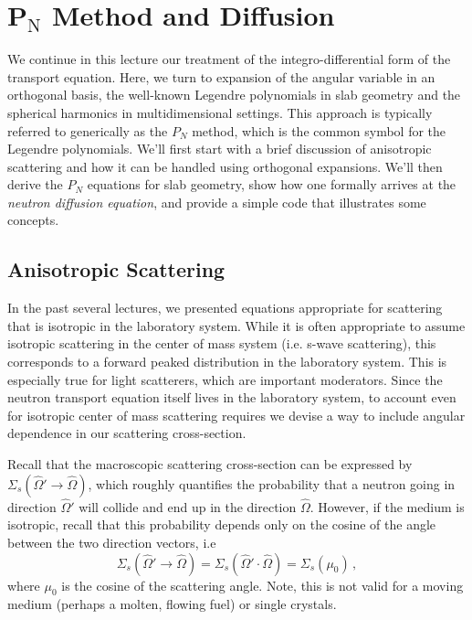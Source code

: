 \chapter{P$\mathrm{_N}$ Method and Diffusion}
\label{lec:pn_method_and_diffusion}

We continue in this lecture our treatment of the integro-differential form of the transport equation.  Here, we turn to expansion of the angular variable in an orthogonal basis, the well-known Legendre polynomials in slab geometry and the spherical harmonics in multidimensional settings.  This approach is typically referred to generically as the $P_N$ method, which is the common symbol for the Legendre polynomials.  We'll first start with a brief discussion of anisotropic scattering and how it can be handled using orthogonal expansions.  We'll then derive the $P_N$ equations for slab geometry, show how one formally arrives at the \textit{neutron diffusion equation}, and provide a simple code that illustrates some concepts.

\section*{Anisotropic Scattering}

In the past several lectures, we presented equations appropriate for scattering that is isotropic in the laboratory system.  While it is often appropriate to assume isotropic scattering in the center of mass system (i.e. s-wave scattering), this corresponds to a forward peaked distribution in the laboratory system.  This is especially true for light scatterers, which are important moderators.  Since the neutron transport equation itself lives in the laboratory system, to account even for isotropic center of mass scattering requires we devise a way to include angular dependence in our scattering cross-section.

Recall that the macroscopic scattering cross-section can be expressed by $\Sigma_s(\hat{\Omega}' \to \hat{\Omega})$, which roughly quantifies the probability that a neutron going in direction $\hat{\Omega}'$ will collide and end up in the direction $\hat{\Omega}$.  However, if the medium is isotropic, recall that this probability depends only on the cosine of the angle between the two direction vectors, i.e 
\begin{equation}
 \Sigma_s(\hat{\Omega}' \to \hat{\Omega}) = \Sigma_s(\hat{\Omega}' \cdot \hat{\Omega}) = \Sigma_s(\mu_0) \, ,
\end{equation}
where $\mu_0$ is the cosine of the scattering angle.  Note, this is not valid for a moving medium (perhaps a molten, flowing fuel) or single crystals.

